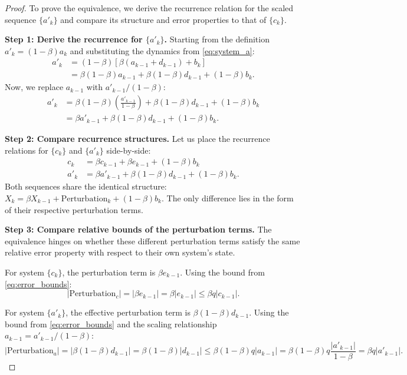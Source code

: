 \documentclass[11pt, letterpaper]{article}
\begin{document}
\begin{proof}
To prove the equivalence, we derive the recurrence relation for the scaled sequence $\{a'_k\}$ and compare its structure and error properties to that of $\{c_k\}$.

\textbf{Step 1: Derive the recurrence for $\{a'_k\}$.}
Starting from the definition $a'_k = (1-\beta)a_k$ and substituting the dynamics from \eqref{eq:system_a}:
\begin{align*}
    a'_k &= (1-\beta) \left[ \beta(a_{k-1} + d_{k-1}) + b_k \right] \\
         &= \beta(1-\beta)a_{k-1} + \beta(1-\beta)d_{k-1} + (1-\beta)b_k.
\end{align*}
Now, we replace $a_{k-1}$ with $a'_{k-1}/(1-\beta)$:
\begin{align*}
    a'_k &= \beta(1-\beta)\left(\frac{a'_{k-1}}{1-\beta}\right) + \beta(1-\beta)d_{k-1} + (1-\beta)b_k \\
         &= \beta a'_{k-1} + \beta(1-\beta)d_{k-1} + (1-\beta)b_k.
\end{align*}

\textbf{Step 2: Compare recurrence structures.}
Let us place the recurrence relations for $\{c_k\}$ and $\{a'_k\}$ side-by-side:
\begin{align*}
    c_k   &= \beta c_{k-1} + \beta e_{k-1} + (1-\beta)b_k \\
    a'_k  &= \beta a'_{k-1} + \beta(1-\beta)d_{k-1} + (1-\beta)b_k.
\end{align*}
Both sequences share the identical structure: $X_k = \beta X_{k-1} + \text{Perturbation}_k + (1-\beta)b_k$. The only difference lies in the form of their respective perturbation terms.

\textbf{Step 3: Compare relative bounds of the perturbation terms.}
The equivalence hinges on whether these different perturbation terms satisfy the same relative error property with respect to their own system's state.

For system $\{c_k\}$, the perturbation term is $\beta e_{k-1}$. Using the bound from \eqref{eq:error_bounds}:
\begin{equation*}
    |\text{Perturbation}_c| = |\beta e_{k-1}| = \beta|e_{k-1}| \le \beta q |c_{k-1}|.
\end{equation*}

For system $\{a'_k\}$, the effective perturbation term is $\beta(1-\beta)d_{k-1}$. Using the bound from \eqref{eq:error_bounds} and the scaling relationship $a_{k-1} = a'_{k-1}/(1-\beta)$:
\begin{equation*}
    |\text{Perturbation}_a| = |\beta(1-\beta)d_{k-1}| = \beta(1-\beta)|d_{k-1}| \le \beta(1-\beta)q|a_{k-1}| = \beta(1-\beta)q\frac{|a'_{k-1}|}{1-\beta} = \beta q |a'_{k-1}|.
\end{equation*}


\end{proof}
\end{document}
